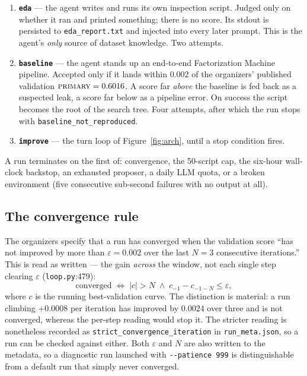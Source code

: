 \documentclass[11pt,a4paper]{article}
\newcommand{\code}[1]{\texttt{#1}}
\newcommand{\file}[1]{\texttt{#1}}
\newcommand{\primary}{\textsc{primary}}
\begin{document}
\begin{enumerate}[leftmargin=1.5em, itemsep=3pt]
  \item \textbf{\code{eda}} --- the agent writes and runs its own inspection script. Judged only
        on whether it ran and printed something; there is no score. Its stdout is persisted to
        \file{eda\_report.txt} and injected into every later prompt. This is the agent's
        \emph{only} source of dataset knowledge. Two attempts.
  \item \textbf{\code{baseline}} --- the agent stands up an end-to-end Factorization Machine
        pipeline. Accepted only if it lands within $0.002$ of the organizers' published
        validation $\primary = 0.6016$. A score far \emph{above} the baseline is fed back as a
        suspected leak, a score far below as a pipeline error. On success the script becomes the
        root of the search tree. Four attempts, after which the run stops with
        \code{baseline\_not\_reproduced}.
  \item \textbf{\code{improve}} --- the turn loop of Figure~\ref{fig:arch}, until a stop condition
        fires.
\end{enumerate}

A run terminates on the first of: convergence, the 50-script cap, the six-hour wall-clock
backstop, an exhausted proposer, a daily LLM quota, or a broken environment (five consecutive
sub-second failures with no output at all).

\subsection{The convergence rule}

The organizers specify that a run has converged when the validation score ``has not improved by
more than $\varepsilon = 0.002$ over the last $N = 3$ consecutive iterations.'' This is read as
written --- the gain \emph{across} the window, not each single step clearing $\varepsilon$
(\file{loop.py}:479):
\[
  \text{converged} \;\iff\; |c| > N \;\wedge\; c_{-1} - c_{-1-N} \le \varepsilon,
\]
where $c$ is the running best-validation curve. The distinction is material: a run climbing
$+0.0008$ per iteration has improved by $0.0024$ over three and is not converged, whereas the
per-step reading would stop it. The stricter reading is nonetheless recorded as
\code{strict\_convergence\_iteration} in \file{run\_meta.json}, so a run can be checked against
either. Both $\varepsilon$ and $N$ are also written to the metadata, so a diagnostic run launched
with \code{-{}-patience 999} is distinguishable from a default run that simply never converged.
\end{document}
